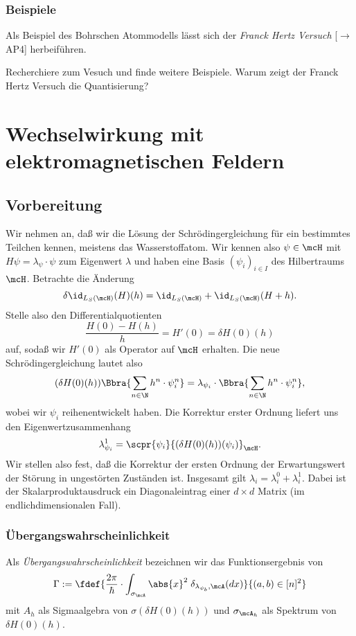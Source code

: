 \documentclass{subfiles}
\begin{document}
    \subsubsection*{Beispiele}
        Als Beispiel des Bohrschen Atommodells lässt sich der \emph{Franck Hertz Versuch} [$\to$ AP4] herbeiführen. 
        \begin{Aufgabe}
            \nr{} Recherchiere zum Vesuch und finde weitere Beispiele. Warum zeigt der Franck Hertz Versuch die Quantisierung?
        \end{Aufgabe}

    \section{Wechselwirkung mit elektromagnetischen Feldern}
        \subsection{Vorbereitung}
            Wir nehmen an, daß wir die Lösung der Schrödingergleichung für ein bestimmtes Teilchen kennen, meistens das Wasserstoffatom. Wir kennen also $\psi\in\mcH$ mit $H\psi = \lambda_\psi\cdot\psi$ zum Eigenwert $\lambda$ und haben eine Basis $(\psi_i)_{i\in I}$ des Hilbertraums $\mcH$. Betrachte die Änderung 
            \[\delta \id_{L_S(\mcH)}(H)(h) = \id_{L_S(\mcH)} + \id_{L_S(\mcH)}(H + h).\]
            Stelle also den Differentialquotienten 
            \[\frac{H(0) - H(h)}{h} = H'(0) = \delta H(0)(h)\]
            auf, sodaß wir $H'(0)$ als Operator auf $\mcH$ erhalten. Die neue Schrödingergleichung lautet also
            \[(\delta H(0)(h))\Bbra{\sum_{n\in\N}h^n\cdot\psi_i^n} = \lambda_{\psi_i}\cdot\Bbra{\sum_{n\in\N}h^n\cdot\psi_i^n},\]
            wobei wir $\psi_i$ reihenentwickelt haben. Die Korrektur erster Ordnung liefert uns den Eigenwertzusammenhang
            \[\lambda_{\psi_i}^1 = \scpr{\psi_i}{(\delta H(0)(h))(\psi_i)}_\mcH.\]
            Wir stellen also fest, daß die Korrektur der ersten Ordnung der Erwartungswert der Störung in ungestörten Zuständen ist. Insgesamt gilt $\lambda_i = \lambda_i^0 + \lambda_i^1$. Dabei ist der Skalarproduktausdruck ein Diagonaleintrag einer $d\times d$ Matrix (im endlichdimensionalen Fall). 
            \subsubsection*{Übergangswahrscheinlichkeit}
                Als \emph{Übergangswahrscheinlichkeit} bezeichnen wir das Funktionsergebnis von
                \[\Gamma:=\fdef{\frac{2\pi}{\hbar}\cdot\int_{\sigma_\mcA}\abs{x}^2\;\delta_{\lambda_{\psi_b},\mcA}(dx)}{(a,b)\in[n]^2}\]
                mit $A_h$ als Sigmaalgebra von $\sigma(\delta H(0)(h))$ und $\sigma_{\mcA_h}$ als Spektrum von $\delta H(0)(h)$.
            
\end{document}

